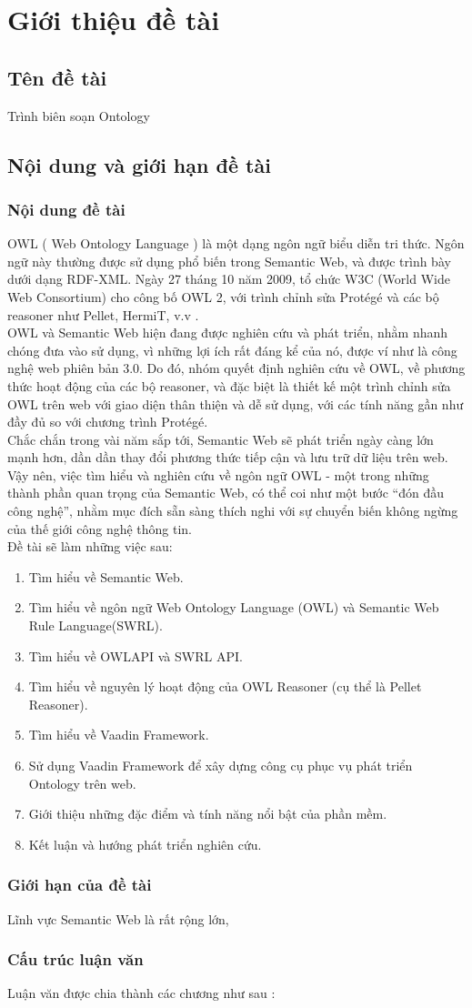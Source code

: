 \chapter {Giới thiệu đề tài}
\section{Tên đề tài}
Trình biên soạn Ontology 
\section{Nội dung và giới hạn đề tài}
\subsection{Nội dung đề tài}
OWL ( Web Ontology Language ) là một dạng ngôn ngữ biểu diễn tri thức. Ngôn ngữ này thường được sử dụng phổ biến trong Semantic Web, và được trình bày dưới dạng RDF-XML. Ngày 27 tháng 10 năm 2009, tổ chức W3C (World Wide Web Consortium) cho công bố OWL 2, với trình chỉnh sửa Protégé và các bộ reasoner như Pellet, HermiT, v.v .
\\
OWL và Semantic Web hiện đang được nghiên cứu và phát triển, nhằm nhanh chóng đưa vào sử dụng, vì những lợi ích rất đáng kể của nó, được ví như là công nghệ web phiên bản 3.0. Do đó, nhóm quyết định nghiên cứu về OWL, về phương thức hoạt động của các bộ reasoner, và đặc biệt là thiết kế một trình chỉnh sửa OWL trên web với giao diện thân thiện và dễ sử dụng, với các tính năng gần như đầy đủ so với chương trình Protégé. 
\\
Chắc chắn trong vài năm sắp tới, Semantic Web sẽ phát triển ngày càng lớn mạnh hơn, dần dần thay đổi phương thức tiếp cận và lưu trữ dữ liệu trên web. Vậy nên, việc tìm hiểu và nghiên cứu về ngôn ngữ OWL - một trong những thành phần quan trọng của Semantic Web, có thể coi như một bước “đón đầu công nghệ”, nhằm mục đích sẵn sàng thích nghi với sự chuyển biến không ngừng của thế giới công nghệ thông tin.
\\
Đề tài sẽ làm những việc sau:
\begin{enumerate}
\item Tìm hiểu về Semantic Web.
\item Tìm hiểu về ngôn ngữ Web Ontology Language (OWL) và Semantic Web Rule Language(SWRL).
\item Tìm hiểu về OWLAPI và SWRL API.
\item Tìm hiểu về nguyên lý hoạt động của OWL Reasoner (cụ thể là Pellet Reasoner).
\item Tìm hiểu về Vaadin Framework.
\item Sử dụng Vaadin Framework để xây dựng công cụ phục vụ phát triển Ontology trên web.
\item Giới thiệu những đặc điểm và tính năng nổi bật của phần mềm.
\item Kết luận và hướng phát triển nghiên cứu.
\end{enumerate}
\subsection{Giới hạn của đề tài}
Lĩnh vực Semantic Web là rất rộng lớn, 

\subsection{Cấu trúc luận văn}
Luận văn được chia thành các chương như sau : 
